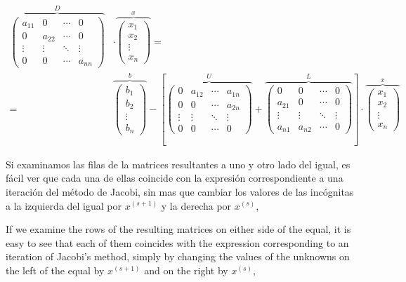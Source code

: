 \begin{align*}
\overbrace{\begin{pmatrix}
a_{11}& 0& \cdots & 0\\
0& a_{22}& \cdots & 0\\
\vdots & \vdots & \ddots & \vdots\\
0& 0& \cdots & a_{nn}
\end{pmatrix}}^D &\cdot \overbrace{\begin{pmatrix}
x_1\\
x_2\\
\vdots \\
x_n
\end{pmatrix}}^x=&\\
=&\overbrace{\begin{pmatrix}
b_1\\
b_2\\
\vdots \\
b_n
\end{pmatrix}}^b-\left[
\overbrace{\begin{pmatrix}
0& a_{12}& \cdots & a_{1n}\\
0& 0& \cdots & a_{2n}\\
\vdots & \vdots & \ddots & \vdots\\
0& 0& \cdots & 0
\end{pmatrix}}^U+
\overbrace{\begin{pmatrix}
0& 0& \cdots & 0\\
a_{21}& 0& \cdots & 0\\
\vdots & \vdots & \ddots & \vdots\\
a_{n1}& a_{n2}& \cdots & 0
\end{pmatrix}}^L \right] \cdot \overbrace{\begin{pmatrix}
x_1\\
x_2\\
\vdots \\
x_n
\end{pmatrix}}^x
\end{align*}

\begin{paracol}{2}
Si examinamos las filas de la matrices resultantes a uno y otro lado del igual, es fácil ver que cada una de ellas coincide con la expresión correspondiente a una iteración del método de Jacobi, sin mas que cambiar los valores de las incógnitas a la izquierda del igual por $x^{(s+1)}$ y la derecha por $x^{(s)}$,

\switchcolumn
If we examine the rows of the resulting matrices on either side of the equal, it is easy to see that each of them coincides with the expression corresponding to an iteration of Jacobi's method, simply by changing the values of the unknowns on the left of the equal by $x^{(s+1)}$ and on the right by $x^{(s)}$,
\end{paracol}

